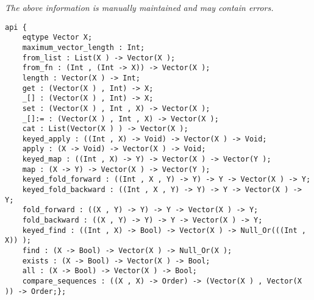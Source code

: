\label{api:Vector}

{\tiny \it The above information is manually maintained and may contain errors.}
\begin{verbatim}
api {
    eqtype Vector X;
    maximum_vector_length : Int;
    from_list : List(X ) -> Vector(X );
    from_fn : (Int , (Int -> X)) -> Vector(X );
    length : Vector(X ) -> Int;
    get : (Vector(X ) , Int) -> X;
    _[] : (Vector(X ) , Int) -> X;
    set : (Vector(X ) , Int , X) -> Vector(X );
    _[]:= : (Vector(X ) , Int , X) -> Vector(X );
    cat : List(Vector(X ) ) -> Vector(X );
    keyed_apply : ((Int , X) -> Void) -> Vector(X ) -> Void;
    apply : (X -> Void) -> Vector(X ) -> Void;
    keyed_map : ((Int , X) -> Y) -> Vector(X ) -> Vector(Y );
    map : (X -> Y) -> Vector(X ) -> Vector(Y );
    keyed_fold_forward : ((Int , X , Y) -> Y) -> Y -> Vector(X ) -> Y;
    keyed_fold_backward : ((Int , X , Y) -> Y) -> Y -> Vector(X ) -> Y;
    fold_forward : ((X , Y) -> Y) -> Y -> Vector(X ) -> Y;
    fold_backward : ((X , Y) -> Y) -> Y -> Vector(X ) -> Y;
    keyed_find : ((Int , X) -> Bool) -> Vector(X ) -> Null_Or(((Int , X)) );
    find : (X -> Bool) -> Vector(X ) -> Null_Or(X );
    exists : (X -> Bool) -> Vector(X ) -> Bool;
    all : (X -> Bool) -> Vector(X ) -> Bool;
    compare_sequences : ((X , X) -> Order) -> (Vector(X ) , Vector(X )) -> Order;};
\end{verbatim}
\index[fun]{\_[]:=}
\index[fun]{\_[]}
